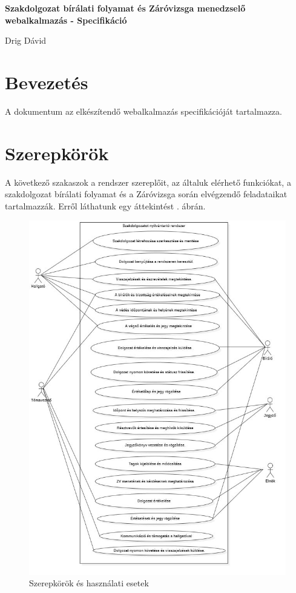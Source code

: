 \documentclass[a4paper,12pt]{article}
\begin{document}
\begin{center}
	{\Large \textbf{Szakdolgozat bírálati folyamat és Záróvizsga menedzselő webalkalmazás - Specifikáció}}

	\bigskip
	
	{\large Drig Dávid}
\end{center}

\tableofcontents

\section{Bevezetés}

A dokumentum az elkészítendő webalkalmazás specifikációját tartalmazza.

\section{Szerepkörök}

A következő szakaszok a rendszer szereplőit, az általuk elérhető funkciókat, a szakdolgozat bírálati folyamat és a Záróvizsga során elvégzendő feladataikat tartalmazzák. Erről láthatunk egy áttekintést . ábrán.

\begin{figure}
	\centering
	\includegraphics[width=\textwidth]{images/Use-case_diagram/use-case_1.jpg}
	\caption{Szerepkörök és használati esetek}
	\label{fig:use-cases}
\end{figure}
\end{document}
